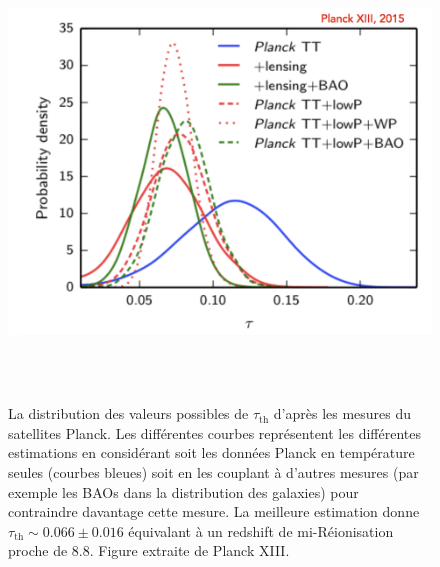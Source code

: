 \begin{figure}[htbp]
	\centering
		\includegraphics[height=12cm]{figs/tau.png}
		\caption[L'opacité Thomson du CMB]{La distribution des valeurs possibles de $\tau_\mathrm{th}$ d'après les mesures du satellites Planck. Les différentes courbes représentent les différentes estimations en considérant soit les données Planck en température seules (courbes bleues) soit en les couplant à d'autres mesures (par exemple les BAOs dans la distribution des galaxies) pour contraindre davantage cette mesure. La meilleure estimation donne $\tau_\mathrm{th}\sim 0.066 \pm 0.016$ équivalant à un redshift de mi-Réionisation proche de 8.8. Figure extraite de Planck XIII.}
	\label{f:tau}
\end{figure}

